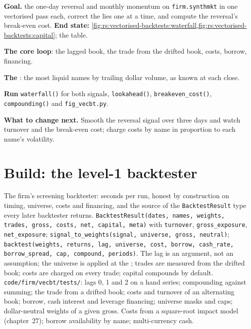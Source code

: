 \begin{tutorial}
\textbf{Goal.}  the one-day reversal and monthly momentum on \texttt{firm.synthmkt} in one vectorised pass each, correct the lies one at a
time, and compute the reversal's break-even cost. \textbf{End state:}
\cref{fig:rs:vectorised-backtests:waterfall,fig:rs:vectorised-backtests:capital}; the table.
\begin{tutsteps}
\item \textbf{The core loop}: the lagged book, the trade from the drifted book, costs, borrow, financing.
\label{lst:rs:vectorised-backtests:loop}
\item \textbf{The }: the most liquid names by trailing dollar volume, as known at each close.
\label{lst:rs:vectorised-backtests:liquid}
\item \textbf{Run} \texttt{waterfall()} for both signals, \texttt{lookahead()}, \texttt{breakeven\_cost()}, \texttt{compounding()} and
\texttt{fig\_vecbt.py}.
\end{tutsteps}
\textbf{What to change next.} Smooth the reversal signal over three days and watch turnover and the break-even cost; charge costs by name in proportion to
each name's volatility.
\end{tutorial}

\section{Build: the level-1 backtester}\label{bld:rs:vectorised-backtests:vecbt}

\begin{build}
 The firm's screening backtester: seconds per run, honest by construction on timing, universe, costs and financing, and the source of the
\texttt{BacktestResult} type every later backtester returns.
 \texttt{BacktestResult(dates, names, weights, trades, gross, costs, net, capital, meta)} with \texttt{turnover},
\texttt{gross\_exposure}, \texttt{net\_exposure}; \texttt{signal\_to\_weights(signal, universe, gross, neutral)}; \texttt{backtest(weights, returns, lag,
universe, cost, borrow, cash\_rate, borrow\_spread, cap, compound, periods)}.
 The lag is an argument, not an assumption; the universe is applied at the ; trades are measured from the drifted book; costs
are charged on every trade; capital compounds by default.
 \texttt{code/firm/vecbt/tests/}: lags 0, 1 and 2 on a hand series; compounding against summing; the trade from a drifted book;
costs and turnover of an alternating book; borrow, cash interest and leverage financing; universe masks and caps; dollar-neutral weights of a given gross.
 Costs from a square-root impact model (chapter~27); borrow availability by name; multi-currency cash.
\end{build}

